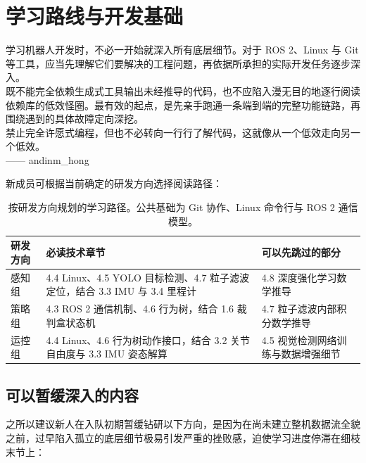 \section{学习路线与开发基础}

\begin{quotebox}
\small
学习机器人开发时，不必一开始就深入所有底层细节。对于 ROS 2、Linux 与 Git 等工具，应当先理解它们要解决的工程问题，再依据所承担的实际开发任务逐步深入。\\
既不能完全依赖生成式工具输出未经推导的代码，也不应陷入漫无目的地逐行阅读依赖库的低效怪圈。最有效的起点，是先亲手跑通一条端到端的完整功能链路，再围绕遇到的具体故障定向深挖。\\
禁止完全许愿式编程，但也不必转向一行行了解代码，这就像从一个低效走向另一个低效。\\
\hfill —— andinm\_hong
\end{quotebox}

新成员可根据当前确定的研发方向选择阅读路径：

\begin{table}[H]
\centering
\small
\begin{tabularx}{\textwidth}{p{2.2cm} X p{4.2cm}}
\toprule
\textbf{研发方向} & \textbf{必读技术章节} & \textbf{可以先跳过的部分} \\
\midrule
感知组 & 4.4 Linux、4.5 YOLO 目标检测、4.7 粒子滤波定位，结合 3.3 IMU 与 3.4 里程计 & 4.8 深度强化学习数学推导 \\
\addlinespace
策略组 & 4.3 ROS 2 通信机制、4.6 行为树，结合 1.6 裁判盒状态机 & 4.7 粒子滤波内部积分数学推导 \\
\addlinespace
运控组 & 4.4 Linux、4.6 行为树动作接口，结合 3.2 关节自由度与 3.3 IMU 姿态解算 & 4.5 视觉检测网络训练与数据增强细节 \\
\bottomrule
\end{tabularx}
\caption{按研发方向规划的学习路径。公共基础为 Git 协作、Linux 命令行与 ROS 2 通信模型。}
\end{table}

\subsection{可以暂缓深入的内容}

之所以建议新人在入队初期暂缓钻研以下方向，是因为在尚未建立整机数据流全貌之前，过早陷入孤立的底层细节极易引发严重的挫败感，迫使学习进度停滞在细枝末节上：

